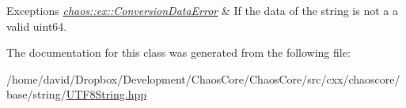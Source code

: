 \begin{DoxyExceptions}{Exceptions}
{\em \hyperlink{classchaos_1_1ex_1_1_conversion_data_error}{chaos\-::ex\-::\-Conversion\-Data\-Error}} & If the data of the string is not a a valid uint64. \\
\hline
\end{DoxyExceptions}


The documentation for this class was generated from the following file\-:\begin{DoxyCompactItemize}
\item 
/home/david/\-Dropbox/\-Development/\-Chaos\-Core/\-Chaos\-Core/src/cxx/chaoscore/base/string/\hyperlink{_u_t_f8_string_8hpp}{U\-T\-F8\-String.\-hpp}\end{DoxyCompactItemize}
